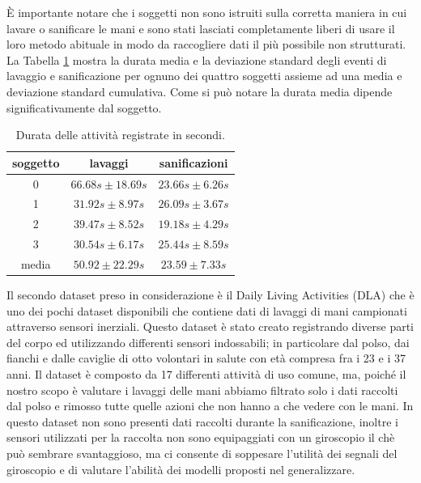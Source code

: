\`E importante notare che i soggetti non sono istruiti sulla corretta maniera in cui lavare o sanificare le mani e sono stati lasciati completamente liberi di usare il loro metodo abituale in modo da raccogliere dati il più possibile non strutturati. La Tabella \ref{tab:activity-duration} mostra la durata media e la deviazione standard degli eventi di lavaggio e sanificazione per ognuno dei quattro soggetti assieme ad una media e deviazione standard cumulativa. Come si può notare la durata media dipende significativamente dal soggetto.

\begin{table}
    \centering
    \begin{tabular}{c c c}
        \hline
        soggetto & lavaggi & sanificazioni  \\
        \hline
        0 & $66.68s \pm 18.69s$ & $23.66s \pm 6.26s$  \\
        1 & $31.92s \pm 8.97s$  & $26.09s \pm 3.67s$  \\
        2 & $39.47s \pm 8.52s$  & $19.18s \pm 4.29s$  \\
        3 & $30.54s \pm 6.17s$  & $25.44s \pm 8.59s$ \\
        \hline
        media & $50.92 \pm 22.29s$  & $23.59 \pm 7.33s$ \\
        \hline
    \end{tabular}
    \caption{Durata delle attività registrate in secondi.}
    \label{tab:activity-duration}
\end{table}

Il secondo dataset preso in considerazione è il Daily Living Activities (DLA) che è uno dei pochi dataset disponibili che contiene dati di lavaggi di mani campionati attraverso sensori inerziali. Questo dataset è stato creato registrando diverse parti del corpo ed utilizzando differenti sensori indossabili; in particolare dal polso, dai fianchi e dalle caviglie di otto volontari in salute con età compresa fra i 23 e i 37 anni. Il dataset è composto da 17 differenti attività di uso comune, ma, poiché il nostro scopo è valutare i lavaggi delle mani abbiamo filtrato solo i dati raccolti dal polso e rimosso tutte quelle azioni che non hanno a che vedere con le mani. In questo dataset non sono presenti dati raccolti durante la sanificazione, inoltre i sensori utilizzati per la raccolta non sono equipaggiati con un giroscopio il chè può sembrare svantaggioso, ma ci consente di soppesare l'utilità dei segnali del giroscopio e di valutare l'abilità dei modelli proposti nel generalizzare.


